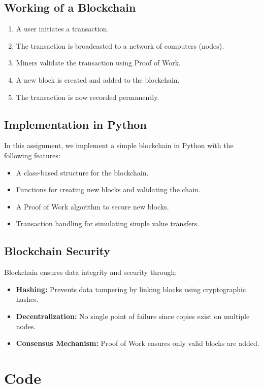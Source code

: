 \documentclass[11pt]{article}
\begin{document}
\subsection{Working of a Blockchain}
\begin{enumerate}
    \item A user initiates a transaction.
    \item The transaction is broadcasted to a network of computers (nodes).
    \item Miners validate the transaction using Proof of Work.
    \item A new block is created and added to the blockchain.
    \item The transaction is now recorded permanently.
\end{enumerate}

\subsection{Implementation in Python}
In this assignment, we implement a simple blockchain in Python with the following features:
\begin{itemize}
    \item A class-based structure for the blockchain.
    \item Functions for creating new blocks and validating the chain.
    \item A Proof of Work algorithm to secure new blocks.
    \item Transaction handling for simulating simple value transfers.
\end{itemize}

\subsection{Blockchain Security}
Blockchain ensures data integrity and security through:
\begin{itemize}
    \item \textbf{Hashing:} Prevents data tampering by linking blocks using cryptographic hashes.
    \item \textbf{Decentralization:} No single point of failure since copies exist on multiple nodes.
    \item \textbf{Consensus Mechanism:} Proof of Work ensures only valid blocks are added.
\end{itemize}



\section{Code}
\end{document}
